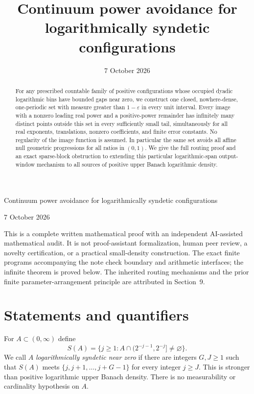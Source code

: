 \documentclass[11pt,letterpaper]{article}
\title{Continuum power avoidance for logarithmically syndetic configurations}
\author{}
\date{7 October 2026}
\begin{document}
\begin{center}
{\LARGE Continuum power avoidance for logarithmically syndetic configurations\par}
\vspace{10pt}
7 October 2026
\end{center}
\vspace{4pt}
\begin{abstract}
For any prescribed countable family of positive configurations whose occupied
dyadic logarithmic bins have bounded gaps near zero, we construct one closed,
nowhere-dense, one-periodic set with measure greater than $1-\varepsilon$ in
every unit interval. Every image with a nonzero leading real power and a
positive-power remainder has infinitely many distinct points outside this
set in every sufficiently small tail, simultaneously for all real exponents,
translations, nonzero coefficients, and finite error constants. No regularity
of the image function is assumed. In particular the same set avoids all affine
null geometric progressions for all ratios in $(0,1)$. We give the full routing
proof and an exact sparse-block obstruction to extending this particular
logarithmic-span output-window mechanism to all sources of positive upper
Banach logarithmic density.
\end{abstract}

This is a complete written mathematical proof with an independent AI-assisted
mathematical audit. It is not proof-assistant formalization, human peer review,
a novelty certification, or a practical small-density construction. The exact
finite programs accompanying the note check boundary and arithmetic interfaces;
the infinite theorem is proved below. The inherited routing mechanisms and the
prior finite parameter-arrangement principle are attributed in Section~9.

\section{Statements and quantifiers}
For $A\subset(0,\infty)$ define
\[
 S(A)=\{j\ge1:A\cap(2^{-j-1},2^{-j}]\ne\varnothing\}.
\]
We call $A$ \emph{logarithmically syndetic near zero} if there are integers
$G,J\ge1$ such that $S(A)$ meets $\{j,j+1,\ldots,j+G-1\}$ for every integer
$j\ge J$. This is stronger than positive logarithmic upper Banach density.
There is no measurability or cardinality hypothesis on $A$.
\end{document}
